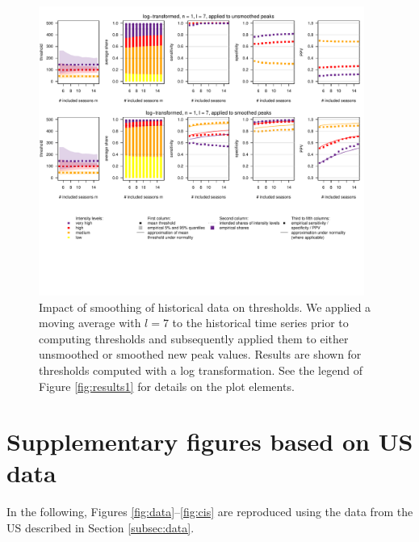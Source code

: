 \documentclass{article}
\begin{document}
\begin{figure}[h!]
\includegraphics[width=0.95\textwidth]{figure/plot_smoothing7_fr_small.pdf}
\caption{Impact of smoothing of historical data on thresholds. We applied a moving average with $l = 7$ to the historical time series prior to computing thresholds and subsequently applied them to either unsmoothed or smoothed new peak values. Results are shown for thresholds computed with a log transformation. See the legend of Figure \ref{fig:results1} for details on the plot elements.}
\label{fig:results_smoothing7}
\end{figure}

\newpage

\section{Supplementary figures based on US data}
\label{suppl:us}

In the following, Figures \ref{fig:data}--\ref{fig:cis} are reproduced using the data from the US described in Section \ref{subsec:data}.
\end{document}
